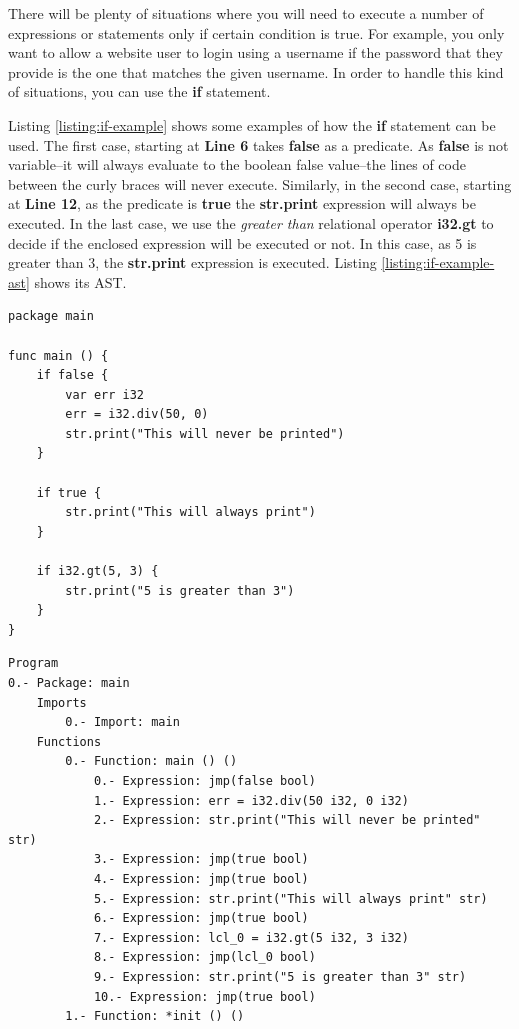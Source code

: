 \documentclass[11pt,fleqn,openany]{book} %
\begin{document}
There will be plenty of situations where you will need to execute a number of expressions or statements only if certain condition is true. For example, you only want to allow a website user to login using a username if the password that they provide is the one that matches the given username. In order to handle this kind of situations, you can use the \textbf{if} statement.

Listing \ref{listing:if-example} shows some examples of how the \textbf{if} statement can be used. The first case, starting at \textbf{Line 6} takes \textbf{false} as a predicate. As \textbf{false} is not variable--it will always evaluate to the boolean false value--the lines of code between the curly braces will never execute. Similarly, in the second case, starting at \textbf{Line 12}, as the predicate is \textbf{true} the \textbf{str.print} expression will always be executed. In the last case, we use the \textit{greater than} relational operator \textbf{i32.gt} to decide if the enclosed expression will be executed or not. In this case, as 5 is greater than 3, the \textbf{str.print} expression is executed. Listing \ref{listing:if-example-ast} shows its AST.

\begin{lstlisting}[caption={Using If for Control Flow},captionpos=b,label={listing:if-example}]
package main

func main () {
    if false {
		var err i32
		err = i32.div(50, 0)
		str.print("This will never be printed")
	}

	if true {
		str.print("This will always print")
	}

	if i32.gt(5, 3) {
		str.print("5 is greater than 3")
	}
}
\end{lstlisting}

\begin{lstlisting}[caption={Listing \ref{listing:if-example}'s Abstract Syntax Tree},captionpos=b,label={listing:if-example-ast}]
Program
0.- Package: main
	Imports
		0.- Import: main
	Functions
		0.- Function: main () ()
			0.- Expression: jmp(false bool)
			1.- Expression: err = i32.div(50 i32, 0 i32)
			2.- Expression: str.print("This will never be printed" str)
			3.- Expression: jmp(true bool)
			4.- Expression: jmp(true bool)
			5.- Expression: str.print("This will always print" str)
			6.- Expression: jmp(true bool)
			7.- Expression: lcl_0 = i32.gt(5 i32, 3 i32)
			8.- Expression: jmp(lcl_0 bool)
			9.- Expression: str.print("5 is greater than 3" str)
			10.- Expression: jmp(true bool)
		1.- Function: *init () ()
\end{lstlisting}
\end{document}
